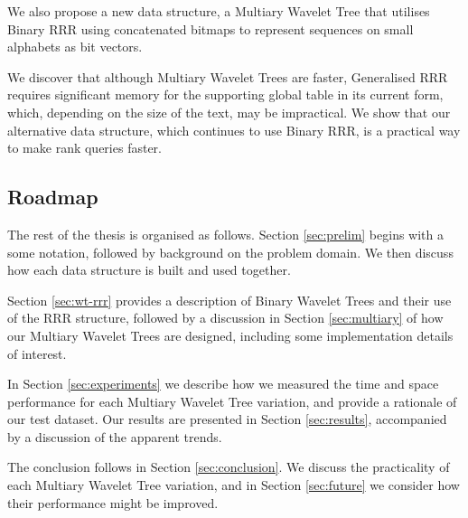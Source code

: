 We also propose a new data structure, a Multiary Wavelet Tree that utilises 
Binary RRR using concatenated bitmaps to represent sequences on small alphabets 
as bit vectors.

We discover that although Multiary Wavelet Trees are faster, Generalised RRR 
requires significant memory for the supporting global table in its current form, 
which, depending on the size of the text, may be impractical. We show that our 
alternative data structure, which continues to use Binary RRR, is a practical 
way to make rank queries faster.


\subsection{Roadmap}

The rest of the thesis is organised as follows. Section \ref{sec:prelim} begins 
with a some notation, followed by background on the problem 
domain. We then discuss how each data structure is built and used together.

Section \ref{sec:wt-rrr} provides a description of Binary Wavelet Trees and 
their use of the RRR structure, followed by a discussion in Section 
\ref{sec:multiary} of how our Multiary Wavelet Trees are designed, including 
some implementation details of interest.

In Section \ref{sec:experiments} we describe how we measured the 
time and space performance for each Multiary Wavelet Tree variation,
and provide a rationale of our test dataset. Our results are presented in 
Section \ref{sec:results}, accompanied by a discussion of the apparent trends.

The conclusion follows in Section \ref{sec:conclusion}. We discuss the 
practicality of each Multiary Wavelet Tree variation, and in Section \ref{sec:future} we 
consider how their performance might be improved.

